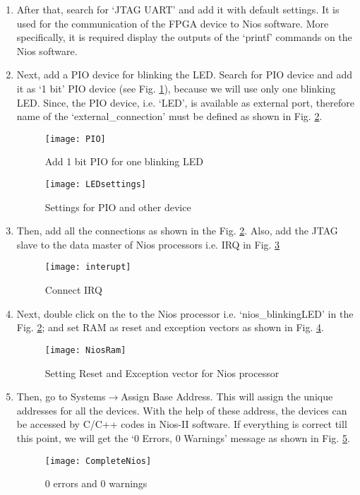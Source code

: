 \begin{enumerate}
	\item After that, search for `JTAG UART' and add it with default settings. It is used for the communication of the FPGA device to Nios software. More specifically, it is required display the outputs of the `printf' commands on the Nios software. 
	
	\item Next, add a PIO device for blinking the LED. Search for PIO device and add it as `1 bit' PIO device (see Fig. \ref{fig:PIO}), because we will use only one blinking LED. Since, the PIO device, i.e. `LED', is available as external port, therefore name of the `external\_connection' must be defined as shown in Fig. \ref{fig:LEDsettings}. 
	
	\begin{figure}[!h]
		\centering
		\texttt{[image: PIO]}
		\caption{Add 1 bit PIO for one blinking LED}
		\label{fig:PIO}
	\end{figure}
	
	\begin{figure}[!h]
		\centering
		\texttt{[image: LEDsettings]}
		\caption{Settings for PIO and other device}
		\label{fig:LEDsettings}
	\end{figure}
	
	\item Then, add all the connections as shown in the Fig. \ref{fig:LEDsettings}. Also, add the JTAG slave to the data master of Nios processors i.e. IRQ in Fig. \ref{fig:interupt}
	
	\begin{figure}[!h]
		\centering
		\texttt{[image: interupt]}
		\caption{Connect IRQ}
		\label{fig:interupt}
	\end{figure}
	
	\item Next, double click on the to the Nios processor i.e. `nios\_blinkingLED' in the Fig. \ref{fig:LEDsettings}; and set RAM as reset and exception vectors as shown in Fig. \ref{fig:NiosRam}.
	\begin{figure}[!h]
		\centering
		\texttt{[image: NiosRam]}
		\caption{Setting Reset and Exception vector for Nios processor}
		\label{fig:NiosRam}
	\end{figure}
	
	
	\item Then, go to Systems$\rightarrow$Assign Base Address. This will assign the unique addresses for all the devices. With the help of these address, the devices can be accessed by C/C++ codes in Nios-II software. If everything is correct till this point, we will get the `0 Errors, 0 Warnings' message as shown in Fig. \ref{fig:CompleteNios}.
	\begin{figure}[!h]
		\centering
		\texttt{[image: CompleteNios]}
		\caption{0 errors and 0 warnings}
		\label{fig:CompleteNios}
	\end{figure}
	

\end{enumerate}
